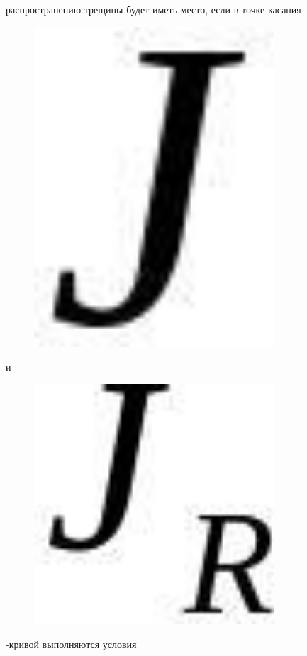 распространению трещины будет иметь место, если в точке касания
\begin{figure}[H]
	\centering
	\includegraphics[width=0.8\textwidth]{assets/1199}
	\caption*{}
\end{figure} и
\begin{figure}[H]
	\centering
	\includegraphics[width=0.8\textwidth]{assets/1200}
	\caption*{}
\end{figure}-кривой выполняются условия

